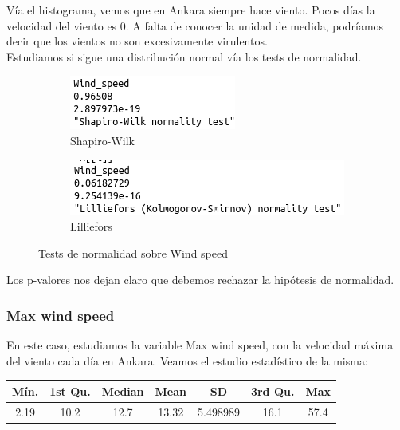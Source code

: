 Vía el histograma, vemos que en Ankara siempre hace viento. Pocos días la velocidad del viento es 0. A falta de conocer la unidad de medida, podríamos decir que los vientos no son excesivamente virulentos.\\

Estudiamos si sigue una distribución normal vía los tests de normalidad.

\begin{figure}[H]
	\centering
	\begin{subfigure}{.5\textwidth}
		\centering
		\includegraphics[width=.7\linewidth]{shapiro-ws.png}
		\caption{Shapiro-Wilk}
		\label{fig:sw-ws}
	\end{subfigure}%
	\begin{subfigure}{.5\textwidth}
		\centering
		\includegraphics[width=.7\linewidth]{lillie-ws.png}	
		\caption{Lilliefors}
		\label{fig:l-ws}
	\end{subfigure}
	\caption{Tests de normalidad sobre Wind speed}
	\label{fig:norm-ws}
\end{figure}

Los p-valores nos dejan claro que debemos rechazar la hipótesis de normalidad. 

\subsubsection{Max wind speed}

En este caso, estudiamos la variable Max wind speed, con la velocidad máxima del viento cada día en Ankara. Veamos el estudio estadístico de la misma:

\begin{table}[H]
	\centering
	\begin{tabular}{|c|c|c|c|c|c|c|}
		\hline
		Mín. & 1st Qu. & Median & Mean  & SD       & 3rd Qu. & Max  \\ \hline
		2.19 & 10.2    & 12.7   & 13.32 & 5.498989 & 16.1    & 57.4 \\ \hline
	\end{tabular}
\end{table}

